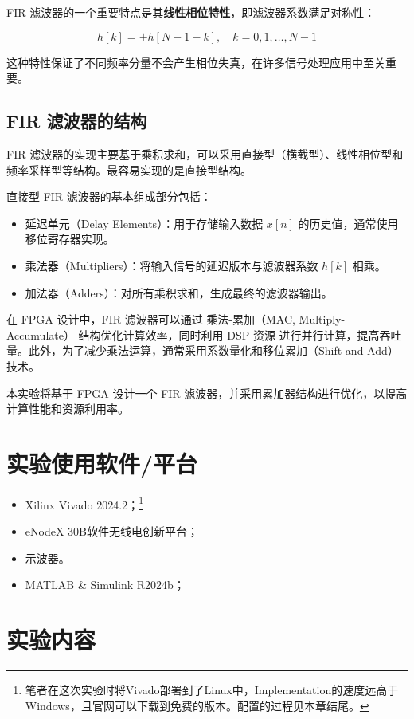 FIR 滤波器的一个重要特点是其\textbf{线性相位特性}，即滤波器系数满足对称性：

\begin{equation}
    h[k] = \pm h[N-1-k], \quad k = 0,1,\dots, N-1
\end{equation}

这种特性保证了不同频率分量不会产生相位失真，在许多信号处理应用中至关重要。

\subsection{FIR 滤波器的结构}

FIR 滤波器的实现主要基于乘积求和，可以采用直接型（横截型）、线性相位型和频率采样型等结构。最容易实现的是直接型结构。


直接型 FIR 滤波器的基本组成部分包括：
\begin{itemize}
    \item 延迟单元（Delay Elements）：用于存储输入数据 $x[n]$ 的历史值，通常使用移位寄存器实现。
    \item 乘法器（Multipliers）：将输入信号的延迟版本与滤波器系数 $h[k]$ 相乘。
    \item 加法器（Adders）：对所有乘积求和，生成最终的滤波器输出。
\end{itemize}

在 FPGA 设计中，FIR 滤波器可以通过 乘法-累加（MAC, Multiply-Accumulate） 结构优化计算效率，同时利用 DSP 资源 进行并行计算，提高吞吐量。此外，为了减少乘法运算，通常采用系数量化和移位累加（Shift-and-Add）技术。

本实验将基于 FPGA 设计一个 FIR 滤波器，并采用累加器结构进行优化，以提高计算性能和资源利用率。
\section{实验使用软件/平台}
\begin{itemize}
  \item Xilinx Vivado 2024.2；\footnote{笔者在这次实验时将Vivado部署到了Linux中，Implementation的速度远高于Windows，且官网可以下载到免费的版本。配置的过程见本章结尾。}
  \item eNodeX 30B软件无线电创新平台；
  \item 示波器。
  \item MATLAB \& Simulink R2024b；
\end{itemize}
\section{实验内容}
